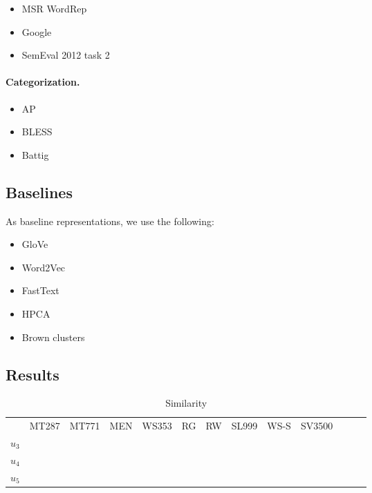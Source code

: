 \documentclass{article}
\begin{document}
    \begin{itemize}
        \item MSR WordRep~\cite{gao2014wordrep}
        \item Google~\cite{mikolov2013distributed}
        \item SemEval 2012 task 2~\cite{jurgens2012semeval}
    \end{itemize}
    
    \paragraph{Categorization.}
    
    \begin{itemize}
        \item AP~\cite{almuhareb2005concept}
        \item BLESS~\cite{baroni2011we}
        \item Battig~\cite{battig1969category}
    \end{itemize}
    
    
    \subsection{Baselines}\label{sec:baselinse}
    
    As baseline representations, we use the following:
    
    \begin{itemize}
        \item GloVe~\cite{pennington2014glove}
        \item Word2Vec~\cite{mikolov2013efficient}
        \item FastText~\cite{mikolov2018advances}
        \item HPCA~\cite{E14-1051}
        \item Brown clusters~\cite{brown1992class}
    \end{itemize}
    
    \subsection{Results}\label{sec:results}
    
    \begin{table}
    	\begin{tabular}{l|cccccccccccc}
    		& MT287 & MT771 & MEN & WS353 & RG & RW & SL999 & WS-S & SV3500 \\
    		$u_3$ \\
    		$u_4$ \\
    		$u_5$
    	\end{tabular}
    	\caption{Similarity}\label{tab:results_sim}
    \end{table}
    
\end{document}
